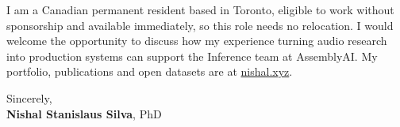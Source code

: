 \documentclass[11pt]{article}
\newcommand{\clName}{Nishal Stanislaus Silva}
\newcommand{\clSite}{https://nishal.xyz}
\newcommand{\clTeam}{the Inference team}
\begin{document}
I am a Canadian permanent resident based in Toronto, eligible to work without sponsorship and available immediately, so this role needs no relocation. I would welcome the opportunity to discuss how my experience turning audio research into production systems can support \clTeam{} at AssemblyAI. My portfolio, publications and open datasets are at \href{\clSite}{nishal.xyz}.

\vspace{12pt}
Sincerely,\\[2pt]
\textbf{\clName}, PhD
\end{document}
